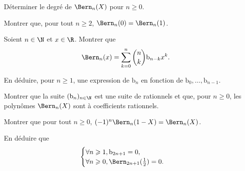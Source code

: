 \begin{exercice}
    \begin{questions}
        \item Déterminer le degré de $\Bern_n(X)$ pour $n \geqslant 0$. 
        \item Montrer que, pour tout $n \geqslant 2$, $\Bern_n(0) = \Bern_n(1)$.
        \item Soient $n \in \N$ et $x \in \R$. Montrer que 
        $$\Bern_n(x) = \sum_{k=0}^n \binom{n}{k} \mathrm{b}_{n-k} x^k.$$
        \item En déduire, pour $n \geqslant 1$, une expression de $\mathrm{b}_n$ en fonction de $\mathrm{b}_0, \dots, \mathrm{b}_{n-1}$.
        \item Montrer que la suite $(\mathrm{b}_n)_{n \in \N}$ est une suite de rationnels et que, pour $n \geqslant 0$, les polynômes $\Bern_n(X)$ sont à coefficients rationnels.
        \item Montrer que pour tout $n \geqslant 0$, $(-1)^n \Bern_n(1-X) = \Bern_n(X)$.
        \item En déduire que 
        $$
        \begin{cases}
            \forall n \geqslant 1, \mathrm{b}_{2n+1} = 0, \\
            \forall n \geqslant 0, \Bern_{2n+1}(\frac{1}{2}) = 0.
        \end{cases}
        $$
    \end{questions}    
\end{exercice}